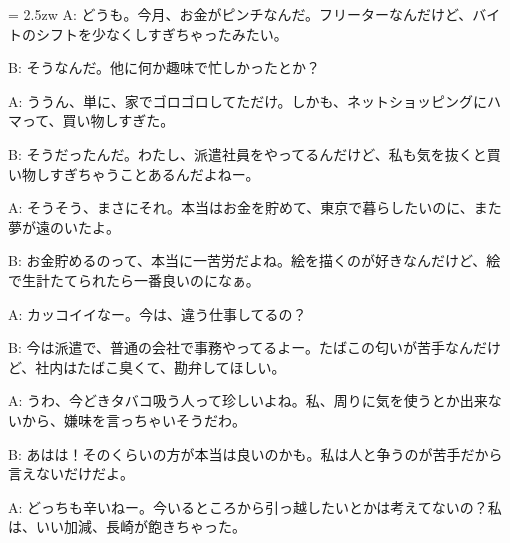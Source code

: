 \documentclass[11pt]{amsart}
\title{}
\author{}
\newenvironment{hangall}[1]{\hangindent = 2.5zw\everypar{\hangindent = 2.5zw}}{}
\begin{document}
\maketitle
\begin{hangall}{}%
A: どうも。今月、お金がピンチなんだ。フリーターなんだけど、バイトのシフトを少なくしすぎちゃったみたい。

B: そうなんだ。他に何か趣味で忙しかったとか？

A: ううん、単に、家でゴロゴロしてただけ。しかも、ネットショッピングにハマって、買い物しすぎた。

B: そうだったんだ。わたし、派遣社員をやってるんだけど、私も気を抜くと買い物しすぎちゃうことあるんだよねー。

A: そうそう、まさにそれ。本当はお金を貯めて、東京で暮らしたいのに、また夢が遠のいたよ。

B: お金貯めるのって、本当に一苦労だよね。絵を描くのが好きなんだけど、絵で生計たてられたら一番良いのになぁ。

A: カッコイイなー。今は、違う仕事してるの？

B: 今は派遣で、普通の会社で事務やってるよー。たばこの匂いが苦手なんだけど、社内はたばこ臭くて、勘弁してほしい。

A: うわ、今どきタバコ吸う人って珍しいよね。私、周りに気を使うとか出来ないから、嫌味を言っちゃいそうだわ。

B: あはは！そのくらいの方が本当は良いのかも。私は人と争うのが苦手だから言えないだけだよ。

A: どっちも辛いねー。今いるところから引っ越したいとかは考えてないの？私は、いい加減、長崎が飽きちゃった。
\end{hangall}
\end{document}
